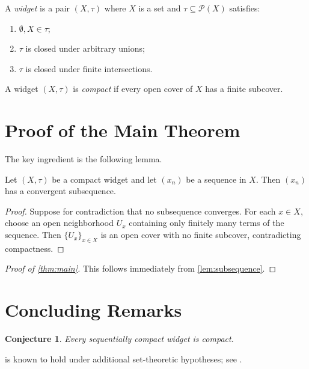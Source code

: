 \documentclass[12pt]{amsart}
\theoremstyle{plain}
\newtheorem{conjecture}[theorem]{Conjecture}
\begin{document}
\begin{definition}\label{def:widget}
  A \emph{widget} is a pair $(X, \tau)$ where $X$ is a set and
  $\tau \subseteq \mathcal{P}(X)$ satisfies:
  \begin{enumerate}
    \item $\emptyset, X \in \tau$;
    \item $\tau$ is closed under arbitrary unions;
    \item $\tau$ is closed under finite intersections.
  \end{enumerate}
\end{definition}

\begin{definition}\label{def:compact}
  A widget $(X, \tau)$ is \emph{compact} if every open cover of $X$ has a
  finite subcover.
\end{definition}

\section{Proof of the Main Theorem}\label{sec:proof}

The key ingredient is the following lemma.

\begin{lemma}\label{lem:subsequence}
  Let $(X, \tau)$ be a compact widget and let $(x_n)$ be a sequence in $X$.
  Then $(x_n)$ has a convergent subsequence.
\end{lemma}

\begin{proof}
  Suppose for contradiction that no subsequence converges.
  For each $x \in X$, choose an open neighborhood $U_x$ containing
  only finitely many terms of the sequence.
  Then $\{U_x\}_{x \in X}$ is an open cover with no finite subcover,
  contradicting compactness.
\end{proof}

\begin{proof}[Proof of \cref{thm:main}]
  This follows immediately from \cref{lem:subsequence}.
\end{proof}

\section{Concluding Remarks}\label{sec:remarks}

\begin{conjecture}\label{conj:converse}
  Every sequentially compact widget is compact.
\end{conjecture}

 is known to hold under additional set-theoretic
hypotheses; see \autocite{example2024}.

\printbibliography
\end{document}

